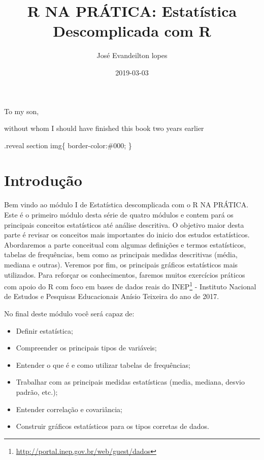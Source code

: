 \documentclass[12pt,]{style/krantz}
\title{R NA PRÁTICA: Estatística Descomplicada com R}
\author{José Evandeilton lopes}
\date{2019-03-03}
\providecommand{\tightlist}{%
  \setlength{\itemsep}{0pt}\setlength{\parskip}{0pt}}
\renewcommand{\href}[2]{#2\footnote{\url{#1}}}
\theoremstyle{definition}
\theoremstyle{definition}
\theoremstyle{definition}
\theoremstyle{remark}
\begin{document}
\maketitle


\thispagestyle{empty}

\begin{center}
To my son,

without whom I should have finished this book two years earlier
\end{center}

\setlength{\abovedisplayskip}{-5pt}
\setlength{\abovedisplayshortskip}{-5pt}

{
\setcounter{tocdepth}{2}
\tableofcontents
}
\listoftables
\listoffigures
.reveal section img\{ border-color:\#000; \}

\chapter*{Introdução}\label{introducao}


Bem vindo ao módulo I de Estatística descomplicada com o R NA PRÁTICA.
Este é o primeiro módulo desta série de quatro módulos e contem pará os
principais conceitos estatísticos até análise descritiva. O objetivo
maior desta parte é revisar os conceitos mais importantes do inicio dos
estudos estatísticos. Abordaremos a parte conceitual com algumas
definições e termos estatísticos, tabelas de frequências, bem como as
principais medidas descritivas (média, mediana e outras). Veremos por
fim, os principais gráficos estatísticos mais utilizados. Para reforçar
os conhecimentos, faremos muitos exercícios práticos com apoio do R com
foco em bases de dados reais do
\href{http://portal.inep.gov.br/web/guest/dados}{INEP} - Instituto
Nacional de Estudos e Pesquisas Educacionais Anísio Teixeira do ano de
2017.

No final deste módulo você será capaz de:

\begin{itemize}
\tightlist
\item
  Definir estatística;
\item
  Compreender os principais tipos de variáveis;
\item
  Entender o que é e como utilizar tabelas de frequências;
\item
  Trabalhar com as principais medidas estatísticas (media, mediana,
  desvio padrão, etc.);
\item
  Entender correlação e covariância;
\item
  Construir gráficos estatísticos para os tipos corretas de dados.
\end{itemize}
\end{document}
